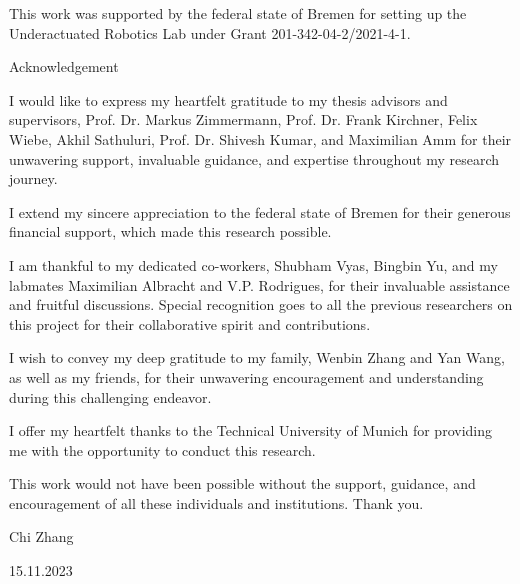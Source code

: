 This work was supported by the federal state of Bremen for setting up the Underactuated Robotics Lab under Grant 201-342-04-2/2021-4-1.

\newpage

\fontsize{18pt}{20pt}\selectfont

\vspace{25.3mm}
Acknowledgement

\normalsize\selectfont
\vspace{13.2mm}
I would like to express my heartfelt gratitude to my thesis advisors and supervisors, Prof. Dr. Markus Zimmermann, Prof. Dr. Frank Kirchner, Felix Wiebe, Akhil Sathuluri, Prof. Dr. Shivesh Kumar, and Maximilian Amm for their unwavering support, invaluable guidance, and expertise throughout my research journey.

I extend my sincere appreciation to the federal state of Bremen for their generous financial support, which made this research possible. 

I am thankful to my dedicated co-workers, Shubham Vyas, Bingbin Yu, and my labmates Maximilian Albracht and V.P. Rodrigues, for their invaluable assistance and fruitful discussions. Special recognition goes to all the previous researchers on this project for their collaborative spirit and contributions.

I wish to convey my deep gratitude to my family, Wenbin Zhang and Yan Wang, as well as my friends, for their unwavering encouragement and understanding during this challenging endeavor.

I offer my heartfelt thanks to the Technical University of Munich for providing me with the opportunity to conduct this research.

This work would not have been possible without the support, guidance, and encouragement of all these individuals and institutions. Thank you.

Chi Zhang

15.11.2023


